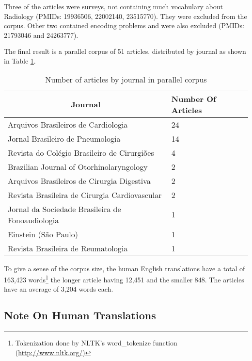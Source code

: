 Three of the articles were surveys, not containing much vocabulary about Radiology (PMIDs: 19936506, 22002140, 23515770). They were excluded from the corpus. Other two contained encoding problems and were also excluded (PMIDs: 21793046 and 24263777).

The final result is a parallel corpus of 51 articles, distributed by journal as shown in Table \ref{table:articles_by_journal}.

\begin{table}[ht]
\centering
\caption{Number of articles by journal in parallel corpus}
\label{table:articles_by_journal}
\begin{tabular}{@{}ll@{}}
\toprule
\multicolumn{1}{c}{\textbf{Journal}}                 & \textbf{Number Of Articles} \\ \midrule
Arquivos Brasileiros de Cardiologia         & 24                          \\
Jornal Brasileiro de Pneumologia            & 14                          \\
Revista do Colégio Brasileiro de Cirurgiões & 4                           \\
Brazilian Journal of Otorhinolaryngology    & 2                           \\
Arquivos Brasileiros de Cirurgia Digestiva  & 2                           \\
Revista Brasileira de Cirurgia Cardiovascular        & 2                           \\
Jornal da Sociedade Brasileira de Fonoaudiologia     & 1                           \\
Einstein (São Paulo)                                 & 1                           \\
Revista Brasileira de Reumatologia                   & 1                           \\ \bottomrule
\end{tabular}
\end{table}

To give a sense of the corpus size, the human English translations have a total of 163,423 words\footnote{Tokenization done by NLTK's word\_tokenize function (\url{http://www.nltk.org/})} the longer article having 12,451 and the smaller 848. The articles have an average of 3,204 words each. 

\subsection{Note On Human Translations}

